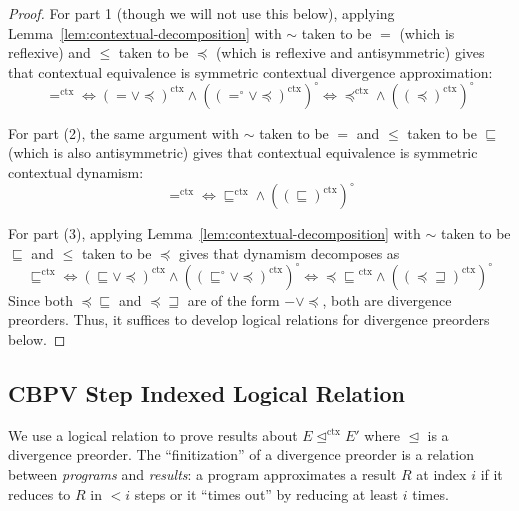 \documentclass[acmsmall,screen,12pt]{acmart}
\newcommand{\ltdyn}{\sqsubseteq}
\newcommand{\gtdyn}{\sqsupseteq}
\newcommand{\apreorder}{\trianglelefteq}
\newcommand{\ctxize}[1]{\mathrel{{#1}^{\text{ctx}}}}
\newcommand\errordivergeleft[0]{\preceq\ltdyn}
\newcommand\errordivergerightop[0]{\preceq\gtdyn}
\begin{document}
{\begin{longonly}
\begin{proof}
For part 1 (though we will not use this below), applying
Lemma~\ref{lem:contextual-decomposition} with $\sim$ taken to be $=$
(which is reflexive) and $\leqslant$ taken to be $\preceq$ (which is
reflexive and antisymmetric) gives that contextual equivalence is
symmetric contextual divergence approximation:
\[
\ctxize= \Leftrightarrow \ctxize{(= \vee \preceq)} \wedge (\ctxize{(=^\circ \vee \preceq)})^\circ
         \Leftrightarrow \ctxize{\preceq} \wedge (\ctxize{(\preceq)})^\circ
\]

For part (2), the same argument with $\sim$ taken to be $=$ and
$\leqslant$ taken to be $\ltdyn$ (which is also antisymmetric) gives that
contextual equivalence is symmetric contextual dynamism:
\[
\ctxize= \Leftrightarrow \ctxize{\ltdyn} \wedge (\ctxize{(\ltdyn)})^\circ
\]

For part (3), applying Lemma~\ref{lem:contextual-decomposition} with $\sim$
taken to be $\ltdyn$ and $\leqslant$ taken to be $\preceq$ gives that
dynamism decomposes as
\[
\ctxize\ltdyn \Leftrightarrow \ctxize{(\ltdyn \vee \preceq)} \wedge (\ctxize{(\ltdyn^\circ \vee \preceq)})^\circ
              \Leftrightarrow \ctxize{\errordivergeleft} \wedge (\ctxize{(\errordivergerightop)})^\circ
\]
Since both ${\errordivergeleft}$ and $\errordivergerightop$ are of the
form $- \vee \preceq$, both are divergence preorders.  Thus, it suffices
to develop logical relations for divergence preorders below.
\end{proof}
\end{longonly}

\subsection{CBPV Step Indexed Logical Relation}
\label{sec:lr}

\begin{shortonly}
We use a logical relation to prove results about $E \ctxize\apreorder
E'$ where $\apreorder$ is a divergence preorder.  The
``finitization'' of a divergence preorder is a relation between
\emph{programs} and \emph{results}: a program approximates a result $R$
at index $i$ if it reduces to $R$ in $< i$ steps or it ``times out'' by reducing at least $i$ times.
\end{shortonly}

}
\end{document}
